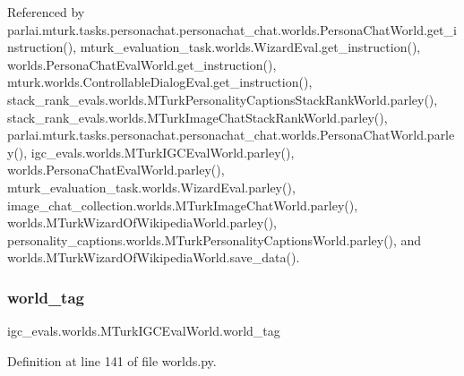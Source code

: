 Referenced by parlai.\+mturk.\+tasks.\+personachat.\+personachat\+\_\+chat.\+worlds.\+Persona\+Chat\+World.\+get\+\_\+instruction(), mturk\+\_\+evaluation\+\_\+task.\+worlds.\+Wizard\+Eval.\+get\+\_\+instruction(), worlds.\+Persona\+Chat\+Eval\+World.\+get\+\_\+instruction(), mturk.\+worlds.\+Controllable\+Dialog\+Eval.\+get\+\_\+instruction(), stack\+\_\+rank\+\_\+evals.\+worlds.\+M\+Turk\+Personality\+Captions\+Stack\+Rank\+World.\+parley(), stack\+\_\+rank\+\_\+evals.\+worlds.\+M\+Turk\+Image\+Chat\+Stack\+Rank\+World.\+parley(), parlai.\+mturk.\+tasks.\+personachat.\+personachat\+\_\+chat.\+worlds.\+Persona\+Chat\+World.\+parley(), igc\+\_\+evals.\+worlds.\+M\+Turk\+I\+G\+C\+Eval\+World.\+parley(), worlds.\+Persona\+Chat\+Eval\+World.\+parley(), mturk\+\_\+evaluation\+\_\+task.\+worlds.\+Wizard\+Eval.\+parley(), image\+\_\+chat\+\_\+collection.\+worlds.\+M\+Turk\+Image\+Chat\+World.\+parley(), worlds.\+M\+Turk\+Wizard\+Of\+Wikipedia\+World.\+parley(), personality\+\_\+captions.\+worlds.\+M\+Turk\+Personality\+Captions\+World.\+parley(), and worlds.\+M\+Turk\+Wizard\+Of\+Wikipedia\+World.\+save\+\_\+data().

\mbox{\label{classigc__evals_1_1worlds_1_1MTurkIGCEvalWorld_a71ee5ba95de2b115ad926db20bf88ae4}} 
\subsubsection{\texorpdfstring{world\+\_\+tag}{world\_tag}}
{\footnotesize\ttfamily igc\+\_\+evals.\+worlds.\+M\+Turk\+I\+G\+C\+Eval\+World.\+world\+\_\+tag}



Definition at line 141 of file worlds.\+py.




